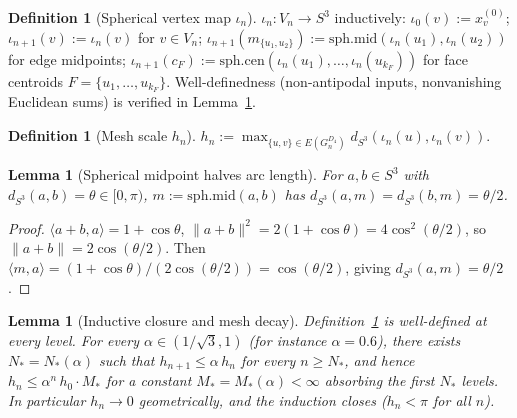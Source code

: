 \documentclass[11pt, a4paper]{amsart}
\newtheorem{lemma}[theorem]{Lemma}
\theoremstyle{definition}
\newtheorem{definition}[theorem]{Definition}
\newcommand{\dsph}{d_{S^3}}
\begin{document}
\begin{definition}[Spherical vertex map $\iota_n$]
\label{def:iota-n}
$\iota_n \colon V_n \to S^3$ inductively:
$\iota_0(v) := x_v^{(0)}$;
$\iota_{n+1}(v) := \iota_n(v)$ for $v \in V_n$;
$\iota_{n+1}(m_{\{u_1, u_2\}}) :=
\mathrm{sph.mid}(\iota_n(u_1), \iota_n(u_2))$ for edge
midpoints;
$\iota_{n+1}(c_F) :=
\mathrm{sph.cen}(\iota_n(u_1), \ldots, \iota_n(u_{k_F}))$ for
face centroids $F = \{u_1, \ldots, u_{k_F}\}$. Well-definedness
(non-antipodal inputs, nonvanishing Euclidean sums) is
verified in Lemma~\ref{lem:induction-closes}.
\end{definition}

\begin{definition}[Mesh scale $h_n$]
\label{def:hn}
$h_n := \max_{\{u, v\} \in E(G_n^{D_4})}
\dsph(\iota_n(u), \iota_n(v))$.
\end{definition}

\begin{lemma}[Spherical midpoint halves arc length]
\label{lem:sph-mid-shrink}
For $a, b \in S^3$ with $\dsph(a, b) = \theta \in [0, \pi)$,
$m := \mathrm{sph.mid}(a, b)$ has $\dsph(a, m) = \dsph(b, m) =
\theta/2$.
\end{lemma}

\begin{proof}
$\langle a + b, a\rangle = 1 + \cos\theta$, $\|a + b\|^2 = 2(1 +
\cos\theta) = 4\cos^2(\theta/2)$, so $\|a + b\| = 2\cos(\theta/2)$.
Then $\langle m, a\rangle = (1 + \cos\theta)/(2\cos(\theta/2)) =
\cos(\theta/2)$, giving $\dsph(a, m) = \theta/2$.
\end{proof}

\begin{lemma}[Inductive closure and mesh decay]
\label{lem:induction-closes}
Definition~\ref{def:iota-n} is well-defined at every level.
For every $\alpha \in (1/\sqrt{3}, 1)$ (for instance $\alpha =
0.6$), there exists $N_\ast = N_\ast(\alpha)$ such that
$h_{n+1} \leq \alpha\,h_n$ for every $n \geq N_\ast$, and hence
$h_n \leq \alpha^n\,h_0 \cdot M_\ast$ for a constant $M_\ast =
M_\ast(\alpha) < \infty$ absorbing the first $N_\ast$ levels. In
particular $h_n \to 0$ geometrically, and the induction closes
($h_n < \pi$ for all $n$).
\end{lemma}
\end{document}
